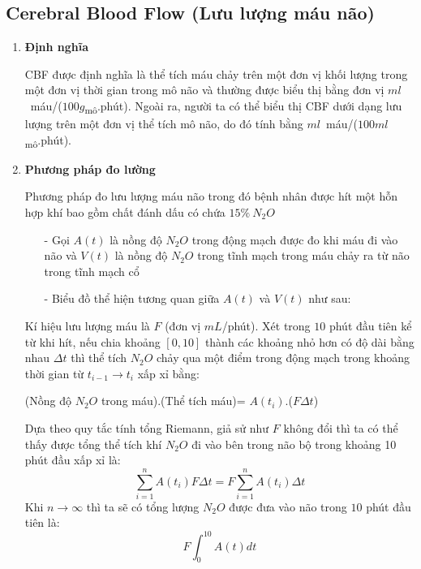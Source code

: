 \documentclass[12pt,a4paper]{article}
\begin{document}
\subsection{Cerebral Blood Flow (Lưu lượng máu não)}
\begin{enumerate}[a/]
	\item \textbf{Định nghĩa}
	      \begin{flushleft}
		      CBF được định nghĩa là thể tích máu chảy trên một đơn vị khối lượng trong
		      một đơn vị thời gian trong mô não và thường được biểu thị bằng đơn vị $ml$\ máu/($100g$\textsubscript{mô}.phút).
		      Ngoài ra, người ta có thể biểu thị CBF dưới dạng lưu lượng trên một đơn vị thể tích mô não,
		      do đó tính bằng $ml$\ máu/($100ml$\textsubscript{mô}.phút).
	      \end{flushleft}
	\item \textbf{Phương pháp đo lường}
	      \begin{flushleft}
		      Phương pháp đo lưu lượng máu não trong đó bệnh nhân được
		      hít một hỗn hợp khí bao gồm chất đánh dấu có chứa $15\%\ N_2O$
		      \begin{itemize}
			      \item[-] 	Gọi $A(t)$ là nồng độ $N_2O$ trong động mạch được đo khi máu đi vào não và $V(t)$ là nồng độ $N_2O$ trong tĩnh mạch trong máu chảy ra từ não trong tĩnh mạch cổ
			      \item[-] 	Biểu đồ thể hiện tương quan giữa $A(t)$ và $V(t)$ như sau:
		      \end{itemize}
		      Kí hiệu lưu lượng máu là $F$ (đơn vị $mL$/phút). Xét trong $10$ phút đầu tiên
		      kể từ khi hít, nếu chia khoảng $\left[0,10\right]$ thành các khoảng nhỏ hơn có độ dài bằng nhau $\Delta t$ thì
		      thể tích $N_2O$ chảy qua một điểm trong động mạch trong khoảng thời gian từ $t_{i-1} \to t_i$ xấp xỉ bằng:
	      \end{flushleft}
	      \begin{center}
		      (Nồng độ $N_2O$ trong máu).(Thể tích máu)= $A(t_i)$.($F \Delta t$)
	      \end{center}
	      \begin{flushleft}
		      Dựa theo quy tắc tính tổng Riemann, giả sử như $F$ không đổi thì ta có thể thấy được tổng thể tích khí $N_2O$ đi vào bên trong não bộ trong khoảng 10 phút đầu xấp xỉ là: 
              $$\sum_{i = 1}^{n} A(t_i)F\Delta t = F \sum_{i = 1}^{n} A(t_i) \Delta t$$
		      Khi $n \to \infty$ thì ta sẽ có tổng lượng $N_2O$ được đưa vào não trong $10$ phút đầu tiên là:
		      $$F \int_{0}^{10} A(t)dt$$

\end{flushleft}
\end{enumerate}
\end{document}
